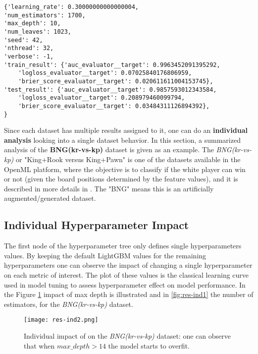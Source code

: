 \begin{lstlisting}[caption={BNG(kr-vs-kp) experiment result for hyperparam combination (0.3, 1700, 10)}, label={lst:krkp-result}]
{'learning_rate': 0.30000000000000004,
'num_estimators': 1700,
'max_depth': 10,
'num_leaves': 1023,
'seed': 42,
'nthread': 32,
'verbose': -1,
'train_result': {'auc_evaluator__target': 0.9963452091395292,
    'logloss_evaluator__target': 0.07025840176806959,
    'brier_score_evaluator__target': 0.020611611004153745},
'test_result': {'auc_evaluator__target': 0.9857593012343584,
    'logloss_evaluator__target': 0.208979460099794,
    'brier_score_evaluator__target': 0.03484311126894392},
}  \end{lstlisting}


Since each dataset has multiple results assigned to it, one can do an \textbf{individual analysis} looking into a single dataset behavior. In this section, a summarized analysis of the \textbf{BNG(kr-vs-kp)} dataset is given as an example. The \textit{BNG(kr-vs-kp)} or "King+Rook versus King+Pawn" is one of the datasets available in the OpenML platform, where the objective is to classify if the white player can win or not (given the board positions determined by the feature values), and it is described in more details in \cite{shapiro1987structured}. The "BNG" means this is an artificially augmented/generated dataset.

\subsection{Individual Hyperparameter Impact}
\label{subsec:indv-impact}

The first node of the hyperparameter tree only defines single hyperparameters values. By keeping the default LightGBM values for the remaining hyperparameters one can observe the impact of changing a single hyperparameter on each metric of interest. The plot of these values is the classical learning curve used in model tuning to assess hyperparameter effect on model performance. In the Figure \ref{fig:res-ind2} impact of max depth is illustrated and in \ref{fig:res-ind1} the number of estimators, for the \textit{BNG(kr-vs-kp)} dataset.

\begin{figure}[!h]
    \centering
    \texttt{[image: res-ind2.png]} 
    \caption{Individual impact of \textbf{} on the \textit{BNG(kr-vs-kp)} dataset: one can observe that when $max\_depth > 14$ the model starts to overfit.}
    \label{fig:res-ind2}
\end{figure}

